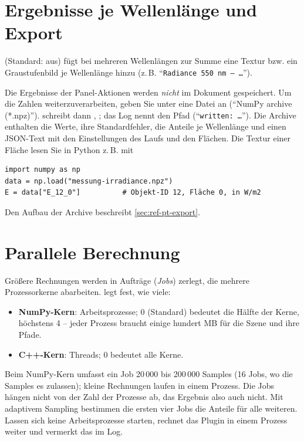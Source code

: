 \section{Ergebnisse je Wellenlänge und Export}\label{sec:pt-export}

 (Standard: aus) fügt bei mehreren Wellenlängen zur Summe eine Textur bzw.
ein Graustufenbild je Wellenlänge hinzu (z.\,B. \enquote{\texttt{Radiance 550 nm – …}}).

Die Ergebnisse der Panel-Aktionen werden \emph{nicht} im Dokument gespeichert. Um die Zahlen
weiterzuverarbeiten, geben Sie unter  eine Datei an (\enquote{NumPy archive
(*.npz)}).  schreibt dann , 
; das Log nennt den Pfad (\enquote{\texttt{written: …}}). Die
Archive enthalten die Werte, ihre Standardfehler, die Anteile je Wellenlänge und einen JSON-Text
 mit den Einstellungen des Laufs und den Flächen. Die Textur einer Fläche lesen Sie in
Python z.\,B. mit
\begin{lstlisting}
import numpy as np
data = np.load("messung-irradiance.npz")
E = data["E_12_0"]          # Objekt-ID 12, Fläche 0, in W/m2
\end{lstlisting}
Den Aufbau der Archive beschreibt \autoref{sec:ref-pt-export}.

\section{Parallele Berechnung}\label{sec:pt-parallel}

Größere Rechnungen werden in Aufträge (\emph{Jobs}) zerlegt, die mehrere Prozessorkerne
abarbeiten.  legt fest, wie viele:
\begin{itemize}
  \item \textbf{NumPy-Kern}: Arbeitsprozesse; 0 (Standard) bedeutet die Hälfte der Kerne, höchstens
    4 -- jeder Prozess braucht einige hundert MB für die Szene und ihre Pfade.
  \item \textbf{C++-Kern}: Threads; 0 bedeutet alle Kerne.
\end{itemize}
Beim NumPy-Kern umfasst ein Job 20\,000 bis 200\,000 Samples (16 Jobs, wo die Samples es zulassen);
kleine Rechnungen laufen in einem Prozess. Die Jobs hängen nicht von der Zahl der Prozesse ab, das
Ergebnis also auch nicht. Mit adaptivem Sampling bestimmen die ersten vier Jobs die Anteile für
alle weiteren. Lassen sich keine Arbeitsprozesse starten, rechnet das Plugin in einem Prozess
weiter und vermerkt das im Log.

